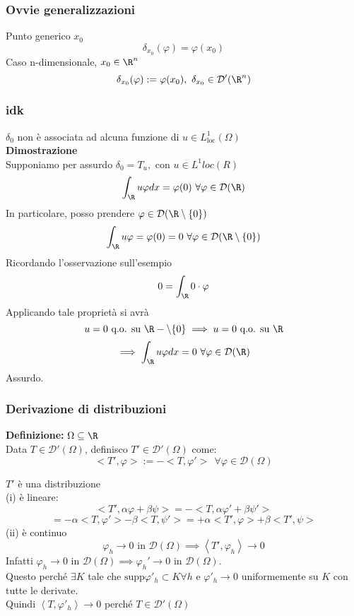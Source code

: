 \subsubsection{Ovvie generalizzazioni}
Punto generico $x_0$
\[\delta_{x_0}(\varphi)=\varphi(x_0)\]
Caso n-dimensionale, $x_0\in \R^n$
\[\delta_{x_0}(\varphi):=\varphi(x_0),\ \delta_{x_0}\in \mathcal D'(\R^n)\]
\subsubsection{idk}
$\delta_0$ non è associata ad alcuna funzione di $u\in L^1_{\text{loc}}(\Omega)$
\\\textbf{Dimostrazione} 
\\Supponiamo per assurdo $\delta_0=T_u,$ con $u\in L^1loc(R)$
\[\int_{\R}^{} u\varphi dx=\varphi(0)\ \forall \varphi \in \mathcal D(\R)\]
In particolare, posso prendere $\varphi \in \mathcal D(\R \setminus \{0\} )$ 
\[\int_{\R}^{} u\varphi=\varphi(0)=0\ \forall \varphi\in\mathcal D(\R\setminus \{ 0\} )\]
Ricordando l'osservazione sull'esempio 
\[0=\int_{\R}^{} 0\cdot \varphi\]
Applicando tale proprietà si avrà
\[u=0\text{ q.o. su }\R-\setminus \{ 0\} \implies u=0\text{ q.o. su }\R\]
\[\implies \int_{\R}^{} u\varphi dx=0\ \forall \varphi \in \mathcal D(\R)\]
Assurdo.
\subsubsection{Derivazione di distribuzioni}
\begin{tcolorbox}
\textbf{Definizione: }$\Omega \subseteq  \R$
\\Data $T\in \mathcal D'(\Omega)$, definisco $T' \in \mathcal D'(\Omega)$ come:
\[<T', \varphi>:=- <T,\varphi'>\ \ \forall \varphi \in \mathcal D(\Omega)\]

\end{tcolorbox}
$T'$ è una distribuzione
\\(i) è lineare:
\[<T',\alpha\varphi +\beta\psi> = -<T,\alpha \varphi'+\beta\psi '>\] \[= -\alpha <T,\varphi'>-\beta<T,\psi'> = +\alpha <T',\varphi>+\beta<T',\psi>\]
(ii) è continuo
\[\varphi_h\to 0\text{ in }\mathcal D(\Omega)\implies \left<T',\varphi_h \right>\to 0\]
Infatti $\varphi_h\to 0\text{ in }\mathcal D(\Omega)\implies\varphi_h'\to 0\text{ in }\mathcal D(\Omega)$.
\\Questo perché $\exists K$ tale che $\text{supp}\varphi'_h\subset K\forall h$ e $\varphi'_h\to 0$ uniformemente su $K$ con tutte le derivate.
\\Quindi $\left<T,\varphi'_h \right>\to 0$ perché $T\in \mathcal D'(\Omega)$
